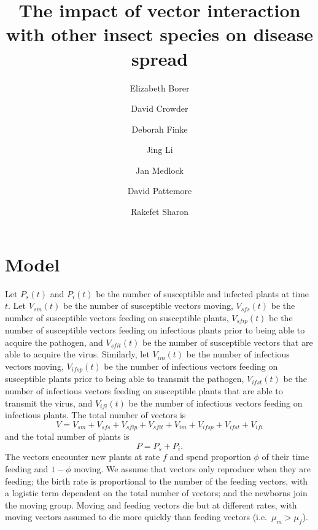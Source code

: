 \documentclass{article}
\title{The impact of vector interaction with other insect species on
  disease spread}
\author{
  Elizabeth Borer
  \and
  David Crowder
  \and
  Deborah Finke
  \and
  Jing Li
  \and
  Jan Medlock
  \and
  David Pattemore
  \and
  Rakefet Sharon
}
\begin{document}
\maketitle

\section{Model}

Let $P_s(t)$ and $P_i(t)$ be the number of susceptible and infected
plants at time $t$.  Let $V_{sm}(t)$ be the number of susceptible
vectors moving, $V_{sfs}(t)$ be the number of susceptible vectors
feeding on susceptible plants, $V_{sfip}(t)$ be the number of
susceptible vectors feeding on infectious plants prior to being able
to acquire the pathogen, and $V_{sfit}(t)$ be the number of
susceptible vectors that are able to acquire the virus.  Similarly,
let $V_{im}(t)$ be the number of infectious vectors moving,
$V_{ifsp}(t)$ be the number of infectious vectors feeding on
susceptible plants prior to being able to transmit the pathogen,
$V_{ifst}(t)$ be the number of infectious vectors feeding on
susceptible plants that are able to transmit the virus, and
$V_{ifi}(t)$ be the number of infectious vectors feeding on infectious
plants.  The total number of vectors is
\begin{equation}
  V = V_{sm} + V_{sfs} + V_{sfip} + V_{sfit} + V_{im} + V_{ifsp} +
  V_{ifst} + V_{ifi}
\end{equation}
and the total number of plants is
\begin{equation}
  P = P_s + P_i.
\end{equation}
The vectors encounter new plants at rate $f$ and spend proportion
$\phi$ of their time feeding and $1 - \phi$ moving.  We assume
that vectors only reproduce when they are feeding; the birth rate is
proportional to the number of the feeding vectors, with a logistic
term dependent on the total number of vectors; and the newborns join
the moving group.  Moving and feeding vectors die but at different
rates, with moving vectors assumed to die more quickly than feeding
vectors (i.e.~$\mu_m > \mu_f$).
\end{document}
